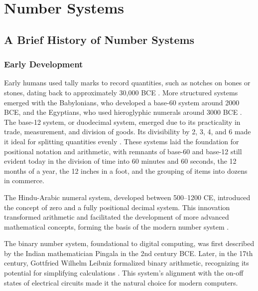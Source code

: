 \chapter{Number Systems}\label{chapt:number_systems}
\localtoc
\section{A Brief History of Number Systems}
\subsection{Early Development}
Early humans used tally marks to record quantities, such as notches on bones or stones, dating back to approximately 30,000 BCE \cite{ifrah2000universal}. More structured systems emerged with the Babylonians, who developed a base-60 system around 2000 BCE, and the Egyptians, who used hieroglyphic numerals around 3000 BCE \cite{ore1990number}. The base-12 system, or duodecimal system, emerged due to its practicality in trade, measurement, and division of goods. Its divisibility by 2, 3, 4, and 6 made it ideal for splitting quantities evenly \cite{wells2010number}. These systems laid the foundation for positional notation and arithmetic, with remnants of base-60 and base-12 still evident today in the division of time into 60 minutes and 60 seconds, the 12 months of a year, the 12 inches in a foot, and the grouping of items into dozens in commerce.

The Hindu-Arabic numeral system, developed between 500–1200 CE, introduced the concept of zero and a fully positional decimal system. This innovation transformed arithmetic and facilitated the development of more advanced mathematical concepts, forming the basis of the modern number system \cite{kline1990mathematics}.

The binary number system, foundational to digital computing, was first described by the Indian mathematician Pingala in the 2nd century BCE. Later, in the 17th century, Gottfried Wilhelm Leibniz formalized binary arithmetic, recognizing its potential for simplifying calculations \cite{kline1990mathematics}. This system’s alignment with the on-off states of electrical circuits made it the natural choice for modern computers.

